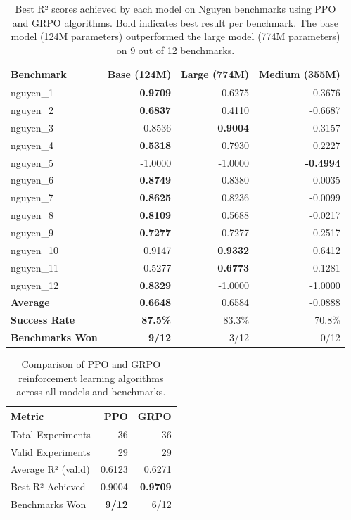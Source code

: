 
\begin{table}[t]
\centering
\caption{Best R² scores achieved by each model on Nguyen benchmarks using PPO and GRPO algorithms. Bold indicates best result per benchmark. The base model (124M parameters) outperformed the large model (774M parameters) on 9 out of 12 benchmarks.}
\label{tab:nguyen_results}
\begin{tabular}{lrrr}
\toprule
\textbf{Benchmark} & \textbf{Base (124M)} & \textbf{Large (774M)} & \textbf{Medium (355M)} \\
\midrule
nguyen\_1  & \textbf{0.9709} & 0.6275 & -0.3676 \\
nguyen\_2  & \textbf{0.6837} & 0.4110 & -0.6687 \\
nguyen\_3  & 0.8536 & \textbf{0.9004} & 0.3157 \\
nguyen\_4  & \textbf{0.5318} & 0.7930 & 0.2227 \\
nguyen\_5  & -1.0000 & -1.0000 & \textbf{-0.4994} \\
nguyen\_6  & \textbf{0.8749} & 0.8380 & 0.0035 \\
nguyen\_7  & \textbf{0.8625} & 0.8236 & -0.0099 \\
nguyen\_8  & \textbf{0.8109} & 0.5688 & -0.0217 \\
nguyen\_9  & \textbf{0.7277} & 0.7277 & 0.2517 \\
nguyen\_10 & 0.9147 & \textbf{0.9332} & 0.6412 \\
nguyen\_11 & 0.5277 & \textbf{0.6773} & -0.1281 \\
nguyen\_12 & \textbf{0.8329} & -1.0000 & -1.0000 \\
\midrule
\textbf{Average} & \textbf{0.6648} & 0.6584 & -0.0888 \\
\textbf{Success Rate} & \textbf{87.5\%} & 83.3\% & 70.8\% \\
\textbf{Benchmarks Won} & \textbf{9/12} & 3/12 & 0/12 \\
\bottomrule
\end{tabular}
\end{table}

\begin{table}[h]
\centering
\caption{Comparison of PPO and GRPO reinforcement learning algorithms across all models and benchmarks.}
\label{tab:algorithm_comparison}
\begin{tabular}{lrr}
\toprule
\textbf{Metric} & \textbf{PPO} & \textbf{GRPO} \\
\midrule
Total Experiments & 36 & 36 \\
Valid Experiments & 29 & 29 \\
Average R² (valid) & 0.6123 & 0.6271 \\
Best R² Achieved & 0.9004 & \textbf{0.9709} \\
Benchmarks Won & \textbf{9/12} & 6/12 \\
\bottomrule
\end{tabular}
\end{table}

